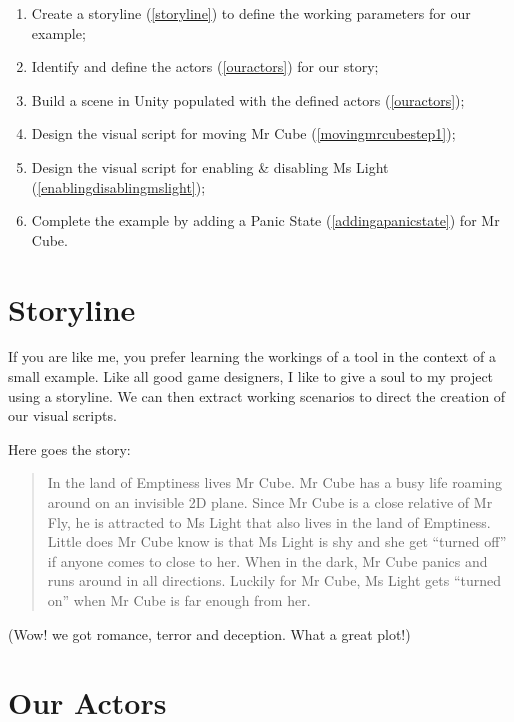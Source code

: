 \begin{enumerate}
\item Create a storyline (\autoref{storyline}) to define the working parameters for our example;

\item Identify and define the actors (\autoref{ouractors}) for our story;

\item Build a scene in Unity populated with the defined actors (\autoref{ouractors});

\item Design the visual script for moving Mr Cube (\autoref{movingmrcubestep1});

\item Design the visual script for enabling \& disabling Ms Light (\autoref{enablingdisablingmslight});

\item Complete the example by adding a Panic State (\autoref{addingapanicstate}) for Mr Cube.

\end{enumerate}

\chapter{Storyline}
\label{storyline}

If you are like me, you prefer learning the workings of a tool in the context of a small example. Like all good game designers, I like to give a soul to my project using a storyline. We can then extract working scenarios to direct the creation of our visual scripts.

Here goes the story:

\begin{quote}

In the land of Emptiness lives Mr Cube. Mr Cube has a busy life roaming around on an invisible 2D plane. Since Mr Cube is a close relative of Mr Fly, he is attracted to Ms Light that also lives in the land of Emptiness. Little does Mr Cube know is that Ms Light is shy and she get ``turned off'' if anyone comes to close to her. When in the dark, Mr Cube panics and runs around in all directions. Luckily for Mr Cube, Ms Light gets ``turned on'' when Mr Cube is far enough from her.
\end{quote}

(Wow! we got romance, terror and deception. What a great plot!)

\chapter{Our Actors}
\label{ouractors}

